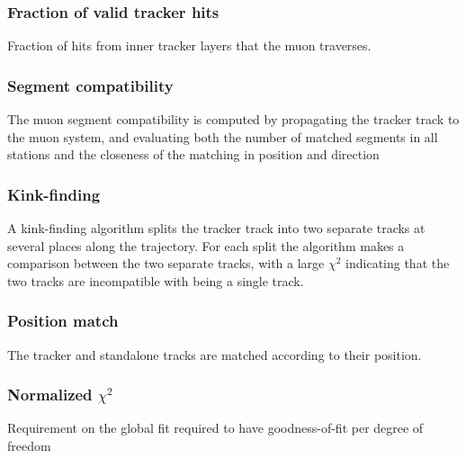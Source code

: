 \subsubsection*{Fraction of valid tracker hits}
\noindent\justify
 Fraction of hits from inner tracker layers that the muon traverses.  
\subsubsection*{Segment compatibility}
\noindent\justify
 The muon segment compatibility is computed by propagating the tracker track to the muon system, and evaluating both the number of matched segments in all stations and the closeness of the matching in position and direction     
\subsubsection*{Kink-finding}
\noindent\justify
A kink-finding algorithm splits the tracker track into two separate tracks at several places along the trajectory.
For each split the algorithm makes a comparison between the two separate tracks, with a large $\chi^{2}$ indicating that the two tracks are incompatible with being a single track.
\subsubsection*{Position match} 
\noindent\justify
The tracker and standalone tracks are matched according to their position. 
\subsubsection*{Normalized $\chi^{2}$}
\noindent\justify
Requirement on the global fit required to have goodness-of-fit per degree of freedom 
